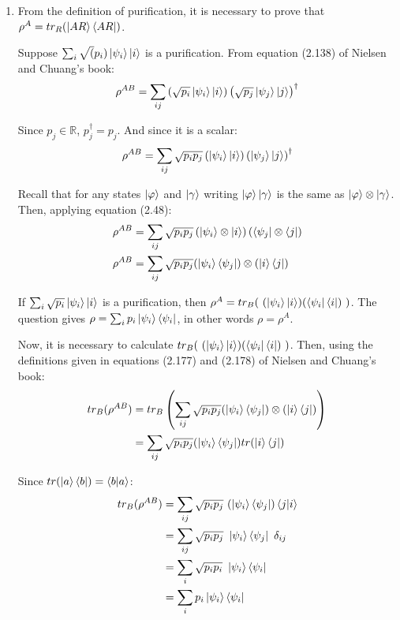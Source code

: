 \begin{enumerate}
\item From the definition of purification, it is necessary to prove that $\rho^A = tr_R(\ket{AR}\bra{AR})$.
    
    Suppose $\sum_i \sqrt(p_i) \ket{\psi_i} \ket{i}$ is a purification. From equation (2.138) of Nielsen and Chuang's book:
    \begin{align}
        \rho^{AB} = \sum_{ij} \left( \sqrt{p_i} \ket{\psi_i} \ket{i} \right) \left( \sqrt{p_j} \ket{\psi_j} \ket{j} \right) ^ \dagger
    \end{align}
    
    Since $p_j \in \mathbb{R}$, $p_j^\dagger = p_j$. And since it is a scalar:
    \begin{align}
        \rho^{AB} = \sum_{ij} \sqrt{p_i p_j} \left( \ket{\psi_i} \ket{i} \right) \left( \ket{\psi_j} \ket{j} \right) ^ \dagger
    \end{align}
    
    Recall that for any states $\ket{\varphi}$ and $\ket{\gamma}$ writing $\ket{\varphi} \ket{\gamma}$ is the same as $\ket{\varphi} \otimes \ket{\gamma}$. Then, applying equation (2.48):
    \begin{align}
        \rho^{AB} &= \sum_{ij} \sqrt{p_i p_j} \left( \ket{\psi_i} \otimes \ket{i} \right)
            \left( \bra{\psi_j} \otimes \bra{j} \right) \\
        \rho^{AB} &= \sum_{ij} \sqrt{p_i p_j} (\ket{\psi_i}\bra{\psi_j}) \otimes (\ket{i}\bra{j})
    \end{align}
    
    If $\sum_i \sqrt{p_i} \ket{\psi_i}\ket{i}$ is a purification, then
    $\rho^A = tr_B(\ (\ket{\psi_i}\ket{i}) (\bra{\psi_i}\bra{i})\ )$.
    The question gives $\rho = \sum_i p_i \ket{\psi_i}\bra{\psi_i}$, in other words $\rho = \rho^A$.
    
    Now, it is necessary to calculate $tr_B(\ (\ket{\psi_i}\ket{i}) (\bra{\psi_i}\bra{i})\ )$. Then, using the definitions given in equations (2.177) and (2.178) of Nielsen and Chuang's book:
    \begin{align}
        tr_B(\rho^{AB}) &= tr_B \left(\sum_{ij} \sqrt{p_i p_j} (\ket{\psi_i}\bra{\psi_j}) \otimes (\ket{i}\bra{j}) \right) \\
        &= \sum_{ij} \sqrt{p_i p_j} (\ket{\psi_i}\bra{\psi_j}) tr(\ket{i}\bra{j})
    \end{align}
    
    Since $tr(\ket{a}\bra{b}) = \mathop{\mathinner{ \langle{b}|{a}\rangle}}$:
    \begin{align}
        tr_B(\rho^{AB}) &= \sum_{ij} \sqrt{p_i p_j}\ (\ket{\psi_i}\bra{\psi_j}) \braket{j}{i} \\
        &= \sum_{ij} \sqrt{p_i p_j}\ \ket{\psi_i}\bra{\psi_j}\ \delta_{ij} \\
        &= \sum_i \sqrt{p_i p_i}\ \ket{\psi_i}\bra{\psi_i} \\
        &= \sum_i p_i\ket{\psi_i}\bra{\psi_i}
    \end{align}
    

\end{enumerate}
